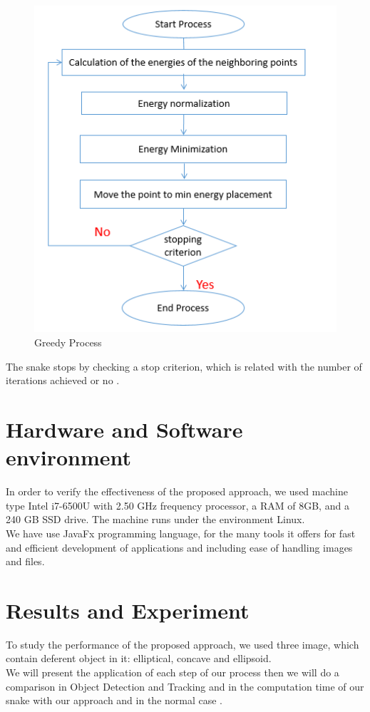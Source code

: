 \begin{figure}[ht!]
    \centering
    \includegraphics[width=12cm]{chapiter3/figures/Figure 5 Greedy Process.png}
    \setlength{\fboxrule}{2pt}
    \caption{Greedy Process}
    \label{fig:figure3.5}
\end{figure}

\hspace{-0.6cm}The snake stops by checking a stop criterion, which is related with the number of
iterations achieved or no .

\section{Hardware and Software environment}\label{sec:hardware-and-software-environment}
In order to verify the effectiveness of the proposed approach, we used machine type
Intel i7-6500U with 2.50 GHz frequency processor, a RAM of 8GB, and a 240 GB SSD
drive. The machine runs under the environment Linux.\\
We have use JavaFx programming language, for the many tools it offers for fast and
efficient development of applications and including ease of handling images and files.
\vspace{4cm}
\section{Results and Experiment}\label{sec:results-and-experiment}
To study the performance of the proposed approach, we used three image, which
contain deferent object in it: elliptical, concave and ellipsoid.\\
We will present the application of each step of our process then we will do a
comparison in Object Detection and Tracking and in the computation time of our
snake with our approach and in the normal case .

